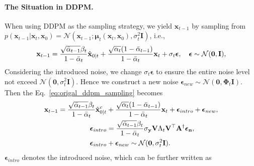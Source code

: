 \documentclass{article} \usepackage{iclr2023_conference,times}
\begin{document}
\paragraph{The Situation in DDPM.}
When using DDPM as the sampling strategy, we yield $\mathbf{x}_{t-1}$ by sampling from $p(\mathbf{x}_{t-1}|\mathbf{x}_{t},\mathbf{x}_{0})=\mathcal{N}(\mathbf{x}_{t-1};\mathbf{\mu}_{t}(\mathbf{x}_{t},\mathbf{x}_{0}),\sigma_{t}^2\mathbf{I})$, i.e., 
\begin{equation}
    \mathbf{x}_{t-1} = \frac{\sqrt{\Bar{\alpha}_{t-1}}\beta_{t}}{1-\Bar{\alpha}_{t}}\hat{\mathbf{x}}_{0|t}+ \frac{\sqrt{\alpha_{t}}(1-\Bar{\alpha}_{t-1})}{1-\Bar{\alpha}_{t}}\mathbf{x}_{t} + \sigma_{t}\boldsymbol{\epsilon},\quad\boldsymbol{\epsilon}\sim\mathcal{N}(\mathbf{0}, \mathbf{I}),
    \label{eq:origal_ddpm_sampling}
\end{equation}
Considering the introduced noise, we change $\sigma_t\boldsymbol{\epsilon}$ to ensure the entire noise level not exceed $\mathcal{N}(\mathbf{0}, \sigma_{t}^2\mathbf{I})$. Hence we construct a new noise $\boldsymbol{\epsilon}_{new}\sim\mathcal{N}(\mathbf{0}, \mathbf{\Phi}_{t}\mathbf{I})$. Then the Eq.~\ref{eq:origal_ddpm_sampling} becomes
\begin{align}
    \mathbf{x}_{t-1} = \frac{\sqrt{\Bar{\alpha}_{t-1}}\beta_{t}}{1-\Bar{\alpha}_{t}}\hat{\mathbf{x}}^c_{0|t}&+ \frac{\sqrt{\alpha_{t}}(1-\Bar{\alpha}_{t-1})}{1-\Bar{\alpha}_{t}}\mathbf{x}_{t} +  \boldsymbol{\epsilon}_{intro} +  \boldsymbol{\epsilon}_{new},\\
    \boldsymbol{\epsilon}_{intro} &= \frac{\sqrt{\Bar{\alpha}_{t-1}}\beta_{t}}{1-\Bar{\alpha}_{t}}\sigma_{\mathbf{y}}\mathbf{V}\Lambda_{t}\mathbf{V}^{\top}\mathbf{A}^{\dagger}\boldsymbol{\epsilon}_{\mathbf{n}},\\
    \boldsymbol{\epsilon}_{intro} &+  \boldsymbol{\epsilon}_{new}\sim\mathcal{N}(\mathbf{0}, \sigma_{t}^2\mathbf{I}).
\end{align}
$\boldsymbol{\epsilon}_{intro}$ denotes the introduced noise, which can be further written as
\end{document}

